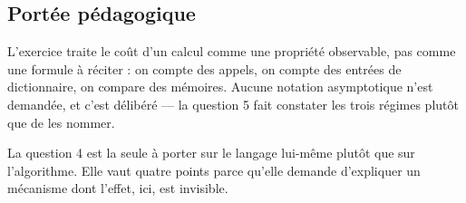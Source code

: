 \subsection*{Portée pédagogique}

L'exercice traite le coût d'un calcul comme une propriété observable, pas comme
une formule à réciter : on compte des appels, on compte des entrées de
dictionnaire, on compare des mémoires. Aucune notation asymptotique n'est
demandée, et c'est délibéré — la question 5 fait constater les trois régimes
plutôt que de les nommer.

La question 4 est la seule à porter sur le langage lui-même plutôt que sur
l'algorithme. Elle vaut quatre points parce qu'elle demande d'expliquer un
mécanisme dont l'effet, ici, est invisible.
